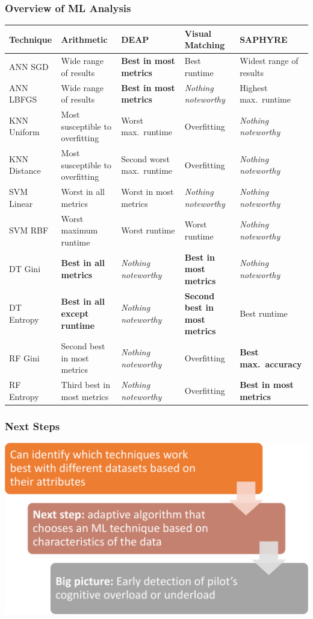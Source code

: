 \documentclass{beamer}
\begin{document}
\begin{frame}
\frametitle{Overview of ML Analysis}
\begin{table}[!t]
\renewcommand{\arraystretch}{1.3}
\centering
\resizebox{\textwidth}{!}
{\begin{tabular}{*{5}{l}}
\toprule
Technique & Arithmetic & DEAP & Visual Matching & SAPHYRE \\ \midrule
ANN SGD & Wide range of results & \textbf{Best in most metrics} & Best runtime & Widest range of results \\
ANN LBFGS & Wide range of results & \textbf{Best in most metrics} & \textit{Nothing noteworthy} & Highest max.~runtime \\
KNN Uniform & Most susceptible to overfitting & Worst max.~runtime & Overfitting & \textit{Nothing noteworthy} \\
KNN Distance & Most susceptible to overfitting & Second worst max.~runtime & Overfitting & \textit{Nothing noteworthy} \\
SVM Linear & Worst in all metrics & Worst in most metrics & \textit{Nothing noteworthy} & \textit{Nothing noteworthy} \\
SVM RBF & Worst maximum runtime & Worst runtime & Worst runtime & \textit{Nothing noteworthy} \\
DT Gini & \textbf{Best in all metrics} & \textit{Nothing noteworthy} & \textbf{Best in most metrics} & \textit{Nothing noteworthy} \\
DT Entropy & \textbf{Best in all except runtime} & \textit{Nothing noteworthy} & \textbf{Second best in most metrics} & Best runtime \\
RF Gini & Second best in most metrics & \textit{Nothing noteworthy} & Overfitting & \textbf{Best max.~accuracy} \\
RF Entropy & Third best in most metrics & \textit{Nothing noteworthy} & Overfitting & \textbf{Best in most metrics} \\ \bottomrule
\end{tabular}}
\end{table}
\end{frame}

\begin{frame}
\frametitle{Next Steps}
\includegraphics[width=\textwidth]{next-steps}
\end{frame}
\end{document}

